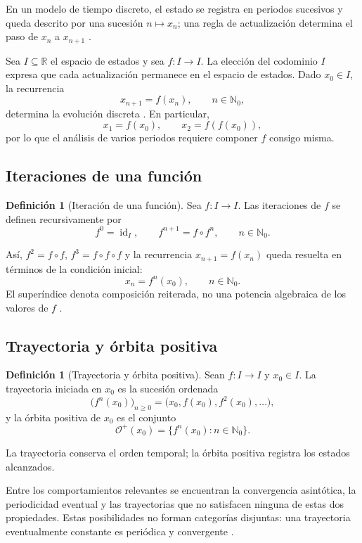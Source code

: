 \documentclass[11pt,letterpaper]{article}
\newcommand{\orb}{\mathcal O^+}
\theoremstyle{definition}
\newtheorem{definicion}[teorema]{Definición}
\theoremstyle{remark}
\begin{document}
En un modelo de tiempo discreto, el estado se registra en periodos sucesivos y
queda descrito por una sucesión \(n\mapsto x_n\); una regla de actualización
determina el paso de \(x_n\) a \(x_{n+1}\) \cite{HirschSmaleDevaney2013}.

Sea \(I\subseteq\mathbb R\) el espacio de estados y sea \(f\colon I\to I\). La elección del codominio \(I\) expresa que cada actualización permanece en el espacio de estados. Dado \(x_0\in I\), la recurrencia
\[
x_{n+1}=f(x_n),\qquad n\in\mathbb N_0,
\]
determina la evolución discreta \cite{HirschSmaleDevaney2013}. En particular,
\[
x_1=f(x_0),
\qquad
x_2=f(f(x_0)),
\]
por lo que el análisis de varios periodos requiere componer \(f\) consigo misma.

\subsection{Iteraciones de una función}

\begin{definicion}[Iteración de una función]
\label{def:iteracion}
Sea \(f\colon I\to I\). Las iteraciones de \(f\) se definen recursivamente por
\[
f^0=\operatorname{id}_I,
\qquad
f^{n+1}=f\circ f^n,
\qquad n\in\mathbb N_0.
\]
\end{definicion}

Así, \(f^2=f\circ f\), \(f^3=f\circ f\circ f\) y la recurrencia \(x_{n+1}=f(x_n)\) queda resuelta en términos de la condición inicial:
\[
x_n=f^n(x_0),\qquad n\in\mathbb N_0.
\]
El superíndice denota composición reiterada, no una potencia algebraica de los valores de \(f\) \cite{Devaney1989}.

\subsection{Trayectoria y órbita positiva}

\begin{definicion}[Trayectoria y órbita positiva]
\label{def:trayectoria-orbita}
Sean \(f\colon I\to I\) y \(x_0\in I\). La trayectoria iniciada en \(x_0\) es la sucesión ordenada
\[
\bigl(f^n(x_0)\bigr)_{n\geq0}
=
\bigl(x_0,f(x_0),f^2(x_0),\ldots\bigr),
\]
y la órbita positiva de \(x_0\) es el conjunto
\[
\orb(x_0)=\{f^n(x_0):n\in\mathbb N_0\}.
\]
\end{definicion}

La trayectoria conserva el orden temporal; la órbita positiva registra los estados alcanzados.

Entre los comportamientos relevantes se encuentran la convergencia asintótica, la periodicidad eventual y las trayectorias que no satisfacen ninguna de estas dos propiedades. Estas posibilidades no forman categorías disjuntas: una trayectoria eventualmente constante es periódica y convergente \cite{Devaney1989}.
\end{document}
